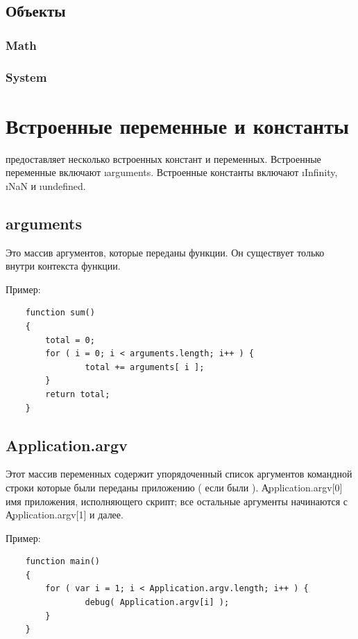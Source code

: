 \documentclass[11pt,russian,a4paper]{article}
\begin{document}
\subsection{Объекты}



\subsubsection{Math}


\subsubsection{System}


\section{Встроенные переменные и константы}

\AS предоставляет несколько встроенных констант и переменных.
Встроенные переменные включают \i{arguments}.
Встроенные константы включают \i{Infinity}, \i{NaN} и \i{undefined}.


\subsection{arguments}

Это массив аргументов, которые переданы функции.
Он существует только внутри контекста функции.

Пример:
\begin{verbatim}
    function sum()
    {
        total = 0;
        for ( i = 0; i < arguments.length; i++ ) {
                total += arguments[ i ];
        }
        return total;
    }
\end{verbatim}

\subsection{Application.argv}

Этот массив переменных содержит упорядоченный список аргументов
командной строки которые были переданы приложению ( если были ).
\c{Application.argv[0]} имя приложения, исполняющего скрипт;
 все остальные аргументы начинаются с \c{Application.argv[1]} и далее.

Пример:
\begin{verbatim}
    function main()
    {
        for ( var i = 1; i < Application.argv.length; i++ ) {
                debug( Application.argv[i] );
        }
    }
\end{verbatim}
\end{document}
